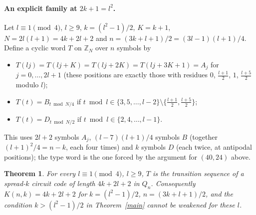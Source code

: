 \documentclass[11pt]{article}
\newtheorem{theorem}{Theorem}
\theoremstyle{remark}
\begin{document}
\paragraph{An explicit family at $2k+1=l^2$.} Let $l\equiv 1 \pmod 4$, $l\ge 9$, $k=(l^2-1)/2$, $K=k+1$, $N=2l(l+1)=4k+2l+2$ and
$n=(3k+l+1)/2=(3l-1)(l+1)/4$. Define a cyclic word $T$ on $\mathbb{Z}_N$ over $n$ symbols by
\begin{itemize}
\item[(A)] $T(lj)=T(lj+K)=T(lj+2K)=T(lj+3K+1)=A_j$ for $j=0,\dots,2l+1$ (these positions are exactly those with residues
$0$, $\tfrac{l+1}{2}$, $1$, $\tfrac{l+5}{2}$ modulo $l$);
\item[(B)] $T(t)=B_{t \bmod N/4}$ if $t \bmod l\in\{3,5,\dots,l-2\}\setminus\{\tfrac{l+1}{2},\tfrac{l+5}{2}\}$;
\item[(D)] $T(t)=D_{t\bmod N/2}$ if $t\bmod l\in\{2,4,\dots,l-1\}$.
\end{itemize}
This uses $2l+2$ symbols $A_j$, $(l-7)(l+1)/4$ symbols $B$ (together $(l+1)^2/4=n-k$, each four times) and $k$ symbols $D$ (each twice,
at antipodal positions); the type word is the one forced by the argument for $(40,24)$ above.
\begin{theorem}\label{fam}
For every $l\equiv 1\pmod 4$, $l\ge 9$, $T$ is the transition sequence of a spread-$k$ circuit code of length $4k+2l+2$ in $Q_n$. Consequently
$K(n,k)=4k+2l+2$ for $k=(l^2-1)/2$, $n=(3k+l+1)/2$, and the condition $k>(l^2-1)/2$ in Theorem~\ref{main} cannot be weakened for these $l$.
\end{theorem}
\end{document}
